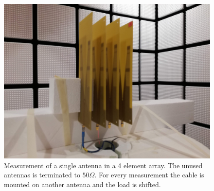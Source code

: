 \begin{figure}[H]
\centering 
\includegraphics[scale = 0.05]{figures/measurement/antennas/single_element_array.jpg}
\caption{Measurement of a single antenna in a 4 element array. The unused antennas is terminated to $50\Omega$. For every measurement the cable is mounted on another antenna and the load is shifted.}
\label{fig:chamber_four_ant0}
\end{figure} 


